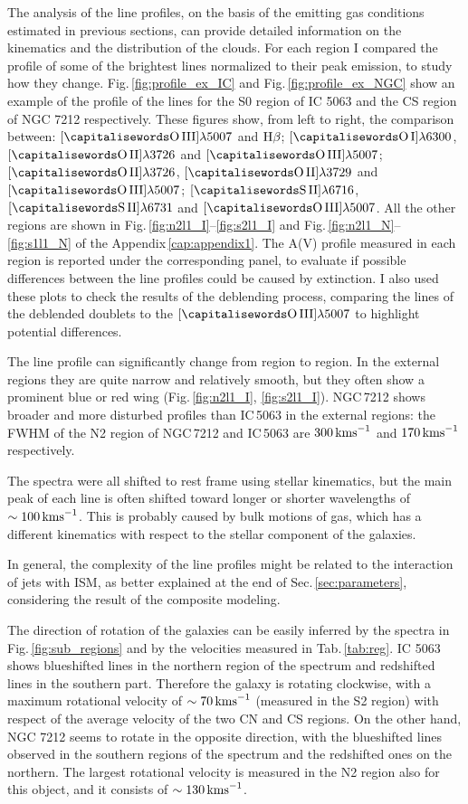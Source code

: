 \documentclass[../main.tex]{subfiles}
\begin{document}
The analysis of the line profiles, on the basis of the emitting gas conditions estimated in previous sections, can provide detailed information on the kinematics and the distribution of the clouds.
For each region I compared the profile of some of the brightest lines normalized to their peak emission, to study how they change.
Fig.\,\ref{fig:profile_ex_IC} and Fig.\,\ref{fig:profile_ex_NGC} show an example of the profile of the lines for the S0 region of IC 5063 and the CS region of NGC 7212 respectively. 
These figures show, from left to right, the comparison between: $[\rm\ion{O}{III}]\lambda5007$ and $\Hb$; $[\rm\ion{O}{I}]\lambda6300$, $[\rm\ion{O}{II}]\lambda3726$ and $[\rm\ion{O}{III}]\lambda5007$; $[\rm\ion{O}{II}]\lambda3726$, $[\rm\ion{O}{II}]\lambda3729$ and $[\rm\ion{O}{III}]\lambda5007$; $[\rm\ion{S}{II}]\lambda6716$, $[\rm\ion{S}{II}]\lambda6731$ and $[\rm\ion{O}{III}]\lambda5007$.
All the other regions are shown in Fig.\,\ref{fig:n2l1_I}--\ref{fig:s2l1_I} and Fig.\,\ref{fig:n2l1_N}--\ref{fig:s1l1_N} of the Appendix\,\ref{cap:appendix1}.
The A(V) profile measured in each region is reported under the corresponding panel, to evaluate if possible differences between the line profiles could be caused by extinction.
I also used these plots to check the results of the deblending process, comparing the lines of the deblended doublets to the $[\rm\ion{O}{III}]\lambda5007$ to highlight potential differences.

The line profile can significantly change from region to region.
In the external regions they are quite narrow and relatively smooth, but they often show a prominent blue or red wing (Fig.\,\ref{fig:n2l1_I}, \ref{fig:s2l1_I}).
NGC\,7212 shows broader and more disturbed profiles than IC\,5063 in the external regions: the FWHM of the N2 region of NGC\,7212 and IC\,5063 are $300\,\si{\kms}$ and $170\,\si{\kms}$ respectively.

The spectra were all shifted to rest frame using stellar kinematics, but the main peak of each line is often shifted toward longer or shorter wavelengths of $\sim100\,\si{\kms}$.
This is probably caused by bulk motions of gas, which has a different kinematics with respect to the stellar component of the galaxies.

In general, the complexity of the line profiles might be related to the interaction of jets with ISM, as better explained at the end of Sec.\,\ref{sec:parameters}, considering the result of the composite modeling.

The direction of rotation of the galaxies can be easily inferred by the spectra in Fig.\,\ref{fig:sub_regions} and by the velocities measured in Tab.\,\ref{tab:reg}.
IC 5063 shows blueshifted lines in the northern region of the spectrum and redshifted lines in the southern part. 
Therefore the galaxy is rotating clockwise, with a maximum rotational velocity of $\sim70\,\si{\kms}$ (measured in the S2 region) with respect of the average velocity of the two CN and CS regions. 
On the other hand, NGC 7212 seems to rotate in the opposite direction, with the blueshifted lines observed in the southern regions of the spectrum and the redshifted ones on the northern.
The largest rotational velocity is measured in the N2 region also for this object, and it consists of $\sim 130\,\si{\kms}$.
\end{document}
